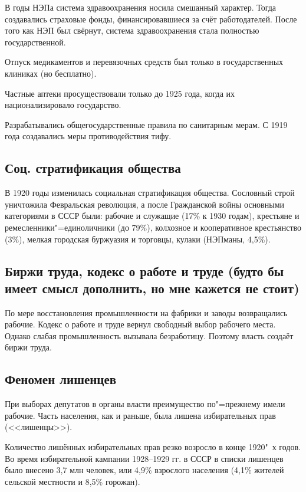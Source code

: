  В годы НЭПа система здравоохранения носила смешанный характер. Тогда создавались страховые фонды, финансировавшиеся за счёт работодателей. После того как НЭП был свёрнут, система здравоохранения стала полностью государственной. 
 
 Отпуск медикаментов и перевязочных средств был только в государственных клиниках (но бесплатно). 
 
 Частные аптеки просуществовали только до 1925 года, когда их национализировало государство. 
 
 Разрабатывались общегосударственные правила по санитарным мерам. С 1919 года создавались меры противодействия тифу.

 \subsection{Соц. стратификация общества}

 В 1920 годы изменилась социальная стратификация общества. Сословный строй уничтожила Февральская революция, а после Гражданской войны основными категориями в СССР были: рабочие и служащие (17\% к 1930 годам), крестьяне и ремесленники"=единоличники (до 79\%), колхозное и кооперативное крестьянство (3\%), мелкая городская буржуазия и торговцы, кулаки (НЭПманы, 4,5\%).

 \subsection{Биржи труда, кодекс о работе и труде (будто бы имеет смысл дополнить, но мне кажется не стоит)}

 По мере восстановления промышленности на фабрики и заводы возвращались рабочие. Кодекс о работе и труде вернул свободный выбор рабочего места. Однако слабая промышленность вызывала безработицу. Поэтому власть создаёт биржи труда. 

 \subsection{Феномен лишенцев}

При выборах депутатов в органы власти преимущество по"=прежнему имели рабочие. Часть населения, как и раньше, была лишена избирательных прав (<<лишенцы>>).

Количество лишённых избирательных прав резко возросло в конце 1920"~х годов. Во время избирательной кампании 1928--1929 гг. в СССР в списки лишенцев было внесено 3,7 млн человек, или 4,9\% взрослого населения (4,1\% жителей сельской местности и 8,5\% горожан).

